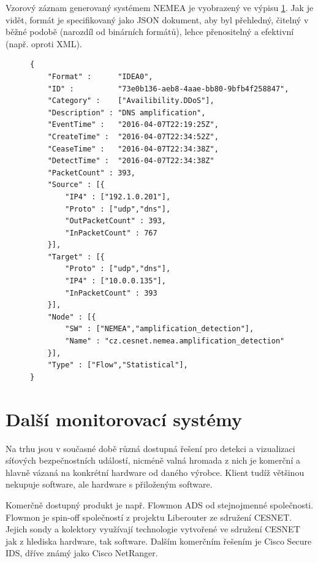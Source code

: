 Vzorový záznam generovaný systémem NEMEA je vyobrazený ve výpisu \ref{code:idea}. Jak je vidět, formát je specifikovaný jako JSON dokument, aby byl přehledný, čitelný v běžné podobě (narozdíl od binárních formátů), lehce přenositelný a efektivní (např. oproti XML\cite{xmlvsjson}).

\begin{figure}[h]
\lstset{basicstyle=\small,style=JSON}
\begin{lstlisting}
{
    "Format" :      "IDEA0",
    "ID" :          "73e0b136-aeb8-4aae-bb80-9bfb4f258847",
    "Category" :    ["Availibility.DDoS"],
    "Description" : "DNS amplification",
    "EventTime" :   "2016-04-07T22:19:25Z",
    "CreateTime" :  "2016-04-07T22:34:52Z",
    "CeaseTime" :   "2016-04-07T22:34:38Z",
    "DetectTime" :  "2016-04-07T22:34:38Z"
    "PacketCount" : 393,
    "Source" : [{
        "IP4" : ["192.1.0.201"],
        "Proto" : ["udp","dns"],
        "OutPacketCount" : 393,
        "InPacketCount" : 767
    }],
    "Target" : [{
        "Proto" : ["udp","dns"],
        "IP4" : ["10.0.0.135"],
        "InPacketCount" : 393
    }],
    "Node" : [{
        "SW" : ["NEMEA","amplification_detection"],
        "Name" : "cz.cesnet.nemea.amplification_detection"
    }],
    "Type" : ["Flow","Statistical"],
}
\end{lstlisting}
\label{code:idea}
\end{figure}

\newpage

\section{Další monitorovací systémy}

Na trhu jsou v současné době různá dostupná řešení pro detekci a vizualizaci síťových bezpečnostních událostí, nicméně valná hromada z nich je komerční a hlavně vázaná na konkrétní hardware od daného výrobce. Klient tudíž většinou nekupuje software, ale hardware s přiloženým software.

Komerčně dostupný produkt je např. Flowmon\cite{flowmon:report} ADS\cite{flowmon:ads} od stejnojmenné společnosti. Flowmon je spin-off společností z projektu Liberouter ze sdružení CESNET. Jejich sondy a kolektory využívají technologie vytvořené ve sdružení CESNET jak z hlediska hardware, tak software. Dalším komerčním řešením je Cisco Secure IDS\cite{cisco:ids}, dříve známý jako Cisco NetRanger.

